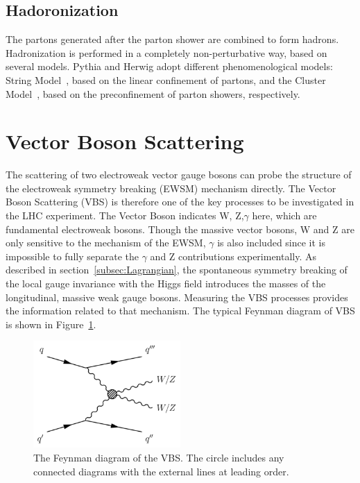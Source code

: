 \subsection{Hadoronization}
The partons generated after the parton shower are combined to form hadrons. 
Hadronization is performed in a completely non-perturbative way, based on several models. 
Pythia and Herwig adopt different phenomenological models: String Model~\cite{ANDERSSON198331}, based on the linear confinement of partons, and the Cluster Model~\cite{MARCHESINI19841}, based on the preconfinement of parton showers, respectively.

\section{Vector Boson Scattering}
\label{sec:VBS}
The scattering of two electroweak vector gauge bosons can probe the structure of the electroweak symmetry breaking (EWSM) mechanism directly. 
The Vector Boson Scattering (VBS) is therefore one of the key processes to be investigated in the LHC experiment.
The Vector Boson indicates W, Z,$\gamma$ here, which are fundamental electroweak bosons. 
Though the massive vector bosons, W and Z are only sensitive to the mechanism of the EWSM, $\gamma$ is also included since it is impossible to fully separate the $\gamma$ and Z contributions experimentally. 
As described in section~\ref{subsec:Lagrangian}, the spontaneous symmetry breaking of the local gauge invariance with the Higgs field
introduces the masses of the longitudinal, massive weak gauge bosons. 
Measuring the VBS processes provides the information related to that mechanism.
The typical Feynman diagram of VBS is shown in Figure~\ref{fig:VBS}.

\begin{figure}[tbp]
\begin{center}
 \includegraphics[width=0.50\textwidth,keepaspectratio]{figures/VBS}
\caption{
The Feynman diagram of the VBS. The circle includes any connected diagrams with the external lines at leading order.%
}
\label{fig:VBS}
\end{center}
\end{figure}

